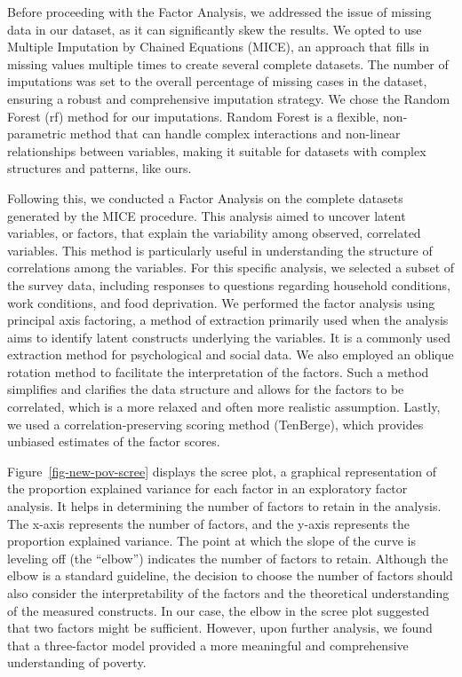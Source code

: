 \documentclass[
]{report}
\begin{document}
Before proceeding with the Factor Analysis, we addressed the issue of
missing data in our dataset, as it can significantly skew the results.
We opted to use Multiple Imputation by Chained Equations (MICE), an
approach that fills in missing values multiple times to create several
complete datasets. The number of imputations was set to the overall
percentage of missing cases in the dataset, ensuring a robust and
comprehensive imputation strategy. We chose the Random Forest (rf)
method for our imputations. Random Forest is a flexible, non-parametric
method that can handle complex interactions and non-linear relationships
between variables, making it suitable for datasets with complex
structures and patterns, like ours.

Following this, we conducted a Factor Analysis on the complete datasets
generated by the MICE procedure. This analysis aimed to uncover latent
variables, or factors, that explain the variability among observed,
correlated variables. This method is particularly useful in
understanding the structure of correlations among the variables. For
this specific analysis, we selected a subset of the survey data,
including responses to questions regarding household conditions, work
conditions, and food deprivation. We performed the factor analysis using
principal axis factoring, a method of extraction primarily used when the
analysis aims to identify latent constructs underlying the variables. It
is a commonly used extraction method for psychological and social data.
We also employed an oblique rotation method to facilitate the
interpretation of the factors. Such a method simplifies and clarifies
the data structure and allows for the factors to be correlated, which is
a more relaxed and often more realistic assumption. Lastly, we used a
correlation-preserving scoring method (TenBerge), which provides
unbiased estimates of the factor scores.

Figure~\ref{fig-new-pov-scree} displays the scree plot, a graphical
representation of the proportion explained variance for each factor in
an exploratory factor analysis. It helps in determining the number of
factors to retain in the analysis. The x-axis represents the number of
factors, and the y-axis represents the proportion explained variance.
The point at which the slope of the curve is leveling off (the
``elbow'') indicates the number of factors to retain. Although the elbow
is a standard guideline, the decision to choose the number of factors
should also consider the interpretability of the factors and the
theoretical understanding of the measured constructs. In our case, the
elbow in the scree plot suggested that two factors might be sufficient.
However, upon further analysis, we found that a three-factor model
provided a more meaningful and comprehensive understanding of poverty.
\end{document}
